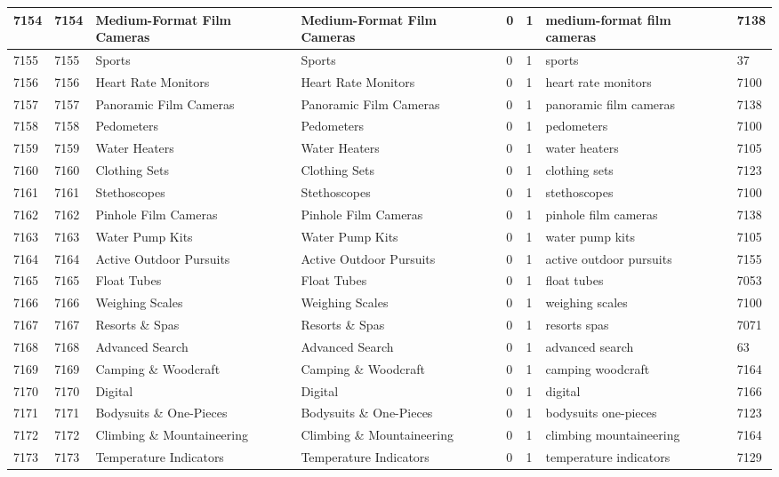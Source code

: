 \begin{longtable}{|l|l|l|l|l|l|l|l|}
7154 & 7154 & Medium-Format Film Cameras & Medium-Format Film Cameras & 0 & 1 & medium-format film cameras & 7138 \\ \hline 
7155 & 7155 & Sports & Sports & 0 & 1 & sports & 37 \\ \hline 
7156 & 7156 & Heart Rate Monitors & Heart Rate Monitors & 0 & 1 & heart rate monitors & 7100 \\ \hline 
7157 & 7157 & Panoramic Film Cameras & Panoramic Film Cameras & 0 & 1 & panoramic film cameras & 7138 \\ \hline 
7158 & 7158 & Pedometers & Pedometers & 0 & 1 & pedometers & 7100 \\ \hline 
7159 & 7159 & Water Heaters & Water Heaters & 0 & 1 & water heaters & 7105 \\ \hline 
7160 & 7160 & Clothing Sets & Clothing Sets & 0 & 1 & clothing sets & 7123 \\ \hline 
7161 & 7161 & Stethoscopes & Stethoscopes & 0 & 1 & stethoscopes & 7100 \\ \hline 
7162 & 7162 & Pinhole Film Cameras & Pinhole Film Cameras & 0 & 1 & pinhole film cameras & 7138 \\ \hline 
7163 & 7163 & Water Pump Kits & Water Pump Kits & 0 & 1 & water pump kits & 7105 \\ \hline 
7164 & 7164 & Active Outdoor Pursuits & Active Outdoor Pursuits & 0 & 1 & active outdoor pursuits & 7155 \\ \hline 
7165 & 7165 & Float Tubes & Float Tubes & 0 & 1 & float tubes & 7053 \\ \hline 
7166 & 7166 & Weighing Scales & Weighing Scales & 0 & 1 & weighing scales & 7100 \\ \hline 
7167 & 7167 & Resorts \& Spas & Resorts \& Spas & 0 & 1 & resorts spas & 7071 \\ \hline 
7168 & 7168 & Advanced Search & Advanced Search & 0 & 1 & advanced search & 63 \\ \hline 
7169 & 7169 & Camping \& Woodcraft & Camping \& Woodcraft & 0 & 1 & camping woodcraft & 7164 \\ \hline 
7170 & 7170 & Digital & Digital & 0 & 1 & digital & 7166 \\ \hline 
7171 & 7171 & Bodysuits \& One-Pieces & Bodysuits \& One-Pieces & 0 & 1 & bodysuits one-pieces & 7123 \\ \hline 
7172 & 7172 & Climbing \& Mountaineering & Climbing \& Mountaineering & 0 & 1 & climbing mountaineering & 7164 \\ \hline 
7173 & 7173 & Temperature Indicators & Temperature Indicators & 0 & 1 & temperature indicators & 7129 \\ \hline 

\end{longtable}
